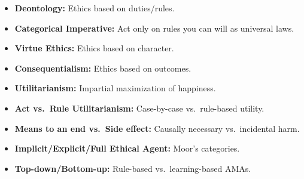 \begin{defbox}
\begin{itemize}
  \item \textbf{Deontology:} Ethics based on duties/rules.
  \item \textbf{Categorical Imperative:} Act only on rules you can will as universal laws.
  \item \textbf{Virtue Ethics:} Ethics based on character.
  \item \textbf{Consequentialism:} Ethics based on outcomes.
  \item \textbf{Utilitarianism:} Impartial maximization of happiness.
  \item \textbf{Act vs.\ Rule Utilitarianism:} Case-by-case vs.\ rule-based utility.
  \item \textbf{Means to an end vs.\ Side effect:} Causally necessary vs.\ incidental harm.
  \item \textbf{Implicit/Explicit/Full Ethical Agent:} Moor's categories.
  \item \textbf{Top-down/Bottom-up:} Rule-based vs.\ learning-based AMAs.
\end{itemize}
\end{defbox}

